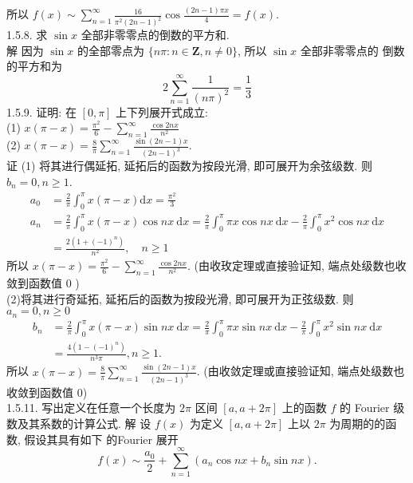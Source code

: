 \documentclass[a4paper,11pt,UTF8]{article}
\begin{document}
所以 $\displaystyle f(x) \sim \sum_{n=1}^{\infty} \frac{16}{\pi^2(2 n-1)^2} \cos \frac{(2 n-1) \pi x}{4}=f(x)$.\\
1.5.8. 求 $\displaystyle \sin x$ 全部非零零点的倒数的平方和.\\
解 因为 $\displaystyle \sin x$ 的全部零点为 $\displaystyle \{n \pi: n \in \mathbf{Z}, n \neq 0\}$, 所以 $\displaystyle \sin x$ 全部非零零点的 倒数的平方和为
$$
2 \sum_{n=1}^{\infty} \frac{1}{(n \pi)^2}=\frac{1}{3}
$$
1.5.9. 证明: 在 $[0, \pi]$ 上下列展开式成立:\\
(1) $\displaystyle x(\pi-x)=\frac{\pi^2}{6}-\sum_{n=1}^{\infty} \frac{\cos 2 n x}{n^2}$\\
(2) $\displaystyle x(\pi-x)=\frac{8}{\pi} \sum_{n=1}^{\infty} \frac{\sin (2 n-1) x}{(2 n-1)^3}$.\\
证 (1) 将其进行偶延拓, 延拓后的函数为按段光滑, 即可展开为余弦级数. 则 $b_n=0, n \geq 1$.\\
$$
\begin{aligned}
	a_0 & =\frac{2}{\pi} \int_0^\pi x(\pi-x) \mathrm{d} x=\frac{\pi^2}{3} \\
	a_n & =\frac{2}{\pi} \int_0^\pi x(\pi-x) \cos n x \mathrm{~d} x=\frac{2}{\pi} \int_0^\pi \pi x \cos n x \mathrm{~d} x-\frac{2}{\pi} \int_0^\pi x^2 \cos n x \mathrm{~d} x \\
	& =\frac{2\left(1+(-1)^n\right)}{n^2}, \quad n \geq 1
\end{aligned}
$$
所以 $\displaystyle x(\pi-x)=\frac{\pi^2}{6}-\sum_{n=1}^{\infty} \frac{\cos 2 n x}{n^2}$. (由收玫定理或直接验证知, 端点处级数也收 敛到函数值 0 )\\
(2)将其进行奇延拓, 延拓后的函数为按段光滑, 即可展开为正弦级数.
则 $a_n=0, n \geq 0$
$$
\begin{aligned}
	b_n & =\frac{2}{\pi} \int_0^\pi x(\pi-x) \sin n x \mathrm{~d} x=\frac{2}{\pi} \int_0^\pi \pi x \sin n x \mathrm{~d} x-\frac{2}{\pi} \int_0^\pi x^2 \sin n x \mathrm{~d} x \\
	& =\frac{4\left(1-(-1)^n\right)}{n^3 \pi}, n \geq 1 .
\end{aligned}
$$
所以 $\displaystyle x(\pi-x)=\frac{8}{\pi} \sum_{n=1}^{\infty} \frac{\sin (2 n-1) x}{(2 n-1)^3}$. (由收敛定理或直接验证知, 端点处级数也 收敛到函数值 0)\\
1.5.11. 写出定义在任意一个长度为 $2 \pi$ 区间 $[a, a+2 \pi]$ 上的函数 $\displaystyle f$ 的 Fourier 级数及其系数的计算公式.
解 设 $\displaystyle f(x)$ 为定义 $[a, a+2 \pi]$ 上以 $2 \pi$ 为周期的的函数, 假设其具有如下 的Fourier 展开
$$
f(x) \sim \frac{a_0}{2}+\sum_{n=1}^{\infty}\left(a_n \cos n x+b_n \sin n x\right) .
$$
\end{document}
